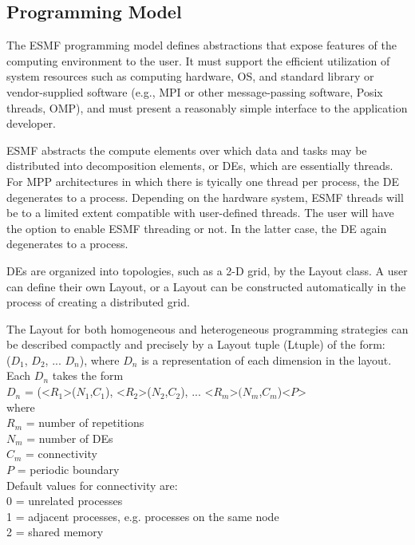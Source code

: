 \subsection{Programming Model}
\label{sec:progmodel}

The ESMF programming model defines abstractions that expose
features of the computing environment to the user.  It must support the 
efficient utilization of system resources such as   
computing hardware, OS, and standard library or vendor-supplied 
software (e.g., MPI or other message-passing software, Posix threads, OMP),
and must present a reasonably simple interface to the application 
developer.  

ESMF abstracts the compute elements over which data and tasks may be
distributed into decomposition elements, or DEs, which
are essentially threads.  For MPP architectures in which there
is tyically one thread per process, the DE degenerates to a process.
Depending on the hardware system, ESMF threads will be to a limited 
extent compatible with user-defined threads.  The user will have 
the option to enable ESMF threading or not.  In the latter case, the
DE again degenerates to a process.

DEs are organized into topologies, such as a 2-D grid, by the Layout 
class.  A user can define their own Layout, or a Layout can be 
constructed automatically in the process of creating a distributed 
grid.  

The Layout for both homogeneous and heterogeneous programming
strategies can be described compactly and precisely by a Layout 
tuple (Ltuple) of the form: \\
($D_{1}$, $D_{2}$, ... $D_{n}$), where $D_{n}$ is a representation of
each dimension in the layout.  \\
Each $D_{n}$ takes the form \\
$D_{n}$ = (<$R_{1}$>($N_{1}$,$C_{1}$), <$R_{2}$>($N_{2}$,$C_{2}$), ... <$R_{m}$>$(N_{m}$,$C_{m}$)<$P$> \\
where \\
$R_{m}$ = number of repetitions \\
$N_{m}$ = number of DEs \\
$C_{m}$ = connectivity \\
$P$ = periodic boundary \\

Default values for connectivity are: \\
0 = unrelated processes \\
1 = adjacent processes, e.g. processes on the same node\\
2 = shared memory \\

